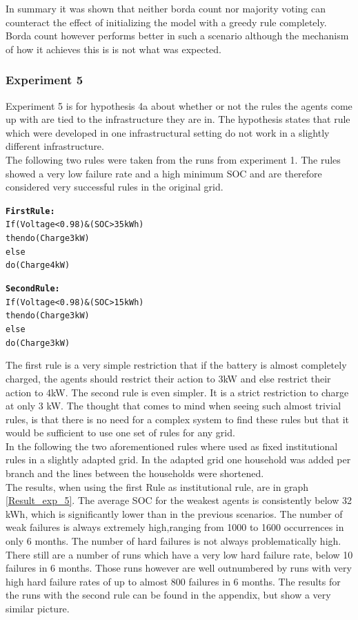 \documentclass[a4paper]{article}
\begin{document}
In summary it was shown that neither borda count nor majority voting can counteract the effect of initializing 
the model with a greedy rule completely. Borda count however performs better in such a scenario although the 
mechanism of how it achieves this is is not what was expected. 
\clearpage
\subsubsection{Experiment 5}
Experiment 5 is for hypothesis 4a about whether or not the rules the agents come up with are tied to the infrastructure they are in. 
The hypothesis states that rule which were developed in one infrastructural setting do not work in a slightly different infrastructure.\\
The following  two rules were taken from the runs from experiment 1. The rules showed a very low failure rate and a high minimum SOC and 
are therefore considered very successful rules in the original grid.\\
\begin{alltt}
\textbf{First Rule:}
If (Voltage < 0.98) & (SOC > 35 kWh)
    then do (Charge 3 kW)
else 
    do  (Charge 4kW)

\textbf{Second Rule:}
If (Voltage < 0.98) & (SOC > 15 kWh)
    then do (Charge 3 kW)
else 
    do  (Charge 3kW)
\end{alltt}
The first rule is a very simple restriction that if the battery is almost completely charged, the agents should restrict their action to 
3kW and else restrict their action to 4kW. The second rule is even simpler. It is a strict restriction to charge at only 3 kW. The thought 
that comes to mind when seeing such almost trivial rules, is that there is no need for a complex system to find these rules but that it 
would be sufficient to use one set of rules for any grid.\\
In the following the two aforementioned rules where used as fixed institutional rules in a slightly adapted grid. In the adapted grid 
one household was added per branch and the lines between the households were shortened. \\
The results, when using the first Rule as institutional rule,  are in graph \ref{Result_exp_5}. The average SOC for the weakest agents 
is consistently below 32 kWh, which is significantly lower than in the previous scenarios. The number of weak failures is always 
extremely high,ranging from 1000 to 1600 occurrences in only 6 months. 
The number of hard failures is not always problematically high. There still are a number of runs which have a very low hard 
failure rate, below 10 failures in 6 months. Those runs however are well outnumbered by runs with very high hard failure rates of up to 
almost 800 failures in 6 months.
The results for the runs with the second rule can be found in the appendix, but show a very similar picture.  
\end{document}
